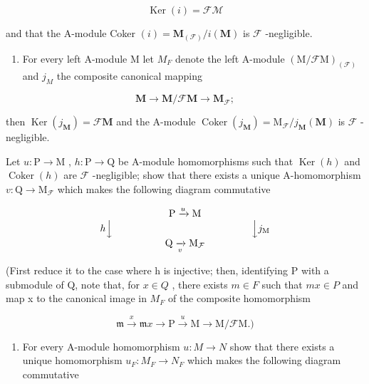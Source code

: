 \[
\operatorname{Ker} (i) = \mathcal {F M}
\]

and that the A-module Coker \((i) = \mathbf{M}_{(\mathcal{F})} / i(\mathbf{M})\) is \(\mathcal{F}\) -negligible.

\begin{enumerate}
\def\labelenumi{(\alph{enumi})}
\setcounter{enumi}{2}
\tightlist
\item
  For every left A-module M let \(M_{F}\) denote the left A-module \((\mathrm{M}/\mathcal{F}\mathrm{M})_{(\mathcal{F})}\) and \(j_{M}\) the composite canonical mapping
\end{enumerate}

\[
\mathbf {M} \rightarrow \mathbf {M} / \mathcal {F} \mathbf {M} \rightarrow \mathbf {M} _ {\mathcal {F}};
\]

then \(\operatorname{Ker}(j_{\mathbf{M}}) = \mathcal{F}\mathbf{M}\) and the A-module \(\operatorname{Coker}(j_{\mathbf{M}}) = \mathrm{M}_{\mathcal{F}} / j_{\mathbf{M}}(\mathbf{M})\) is \(\mathcal{F}\) -negligible.

Let \(u: \mathrm{P} \to \mathrm{M}\) , \(h: \mathrm{P} \to \mathrm{Q}\) be A-module homomorphisms such that \(\operatorname{Ker}(h)\) and \(\operatorname{Coker}(h)\) are \(\mathcal{F}\) -negligible; show that there exists a unique A-homomorphism \(v: \mathrm{Q} \to \mathrm{M}_{\mathcal{F}}\) which makes the following diagram commutative

\[
\begin{array}{c} \mathrm{P} \xrightarrow {u} \mathrm{M} \\ h \Big \downarrow \qquad \qquad \qquad \qquad \qquad \qquad \qquad \Big \downarrow j _ {\mathrm{M}} \\ \mathrm{Q} \xrightarrow [ v ]{} \mathrm{M} _ {\mathcal {F}} \end{array}
\]

(First reduce it to the case where h is injective; then, identifying P with a submodule of Q, note that, for \(x \in Q\) , there exists \(m \in F\) such that \(mx \in P\) and map x to the canonical image in \(M_{F}\) of the composite homomorphism

\[
\mathfrak {m} \xrightarrow {x} \mathfrak {m} x \to \mathrm{P} \xrightarrow {u} \mathrm{M} \to \mathrm{M} / \mathcal {F} \mathrm{M.})
\]

\begin{enumerate}
\def\labelenumi{(\alph{enumi})}
\setcounter{enumi}{3}
\tightlist
\item
  For every A-module homomorphism \(u: M \rightarrow N\) show that there exists a unique homomorphism \(u_{F}: M_{F} \rightarrow N_{F}\) which makes the following diagram commutative
\end{enumerate}

